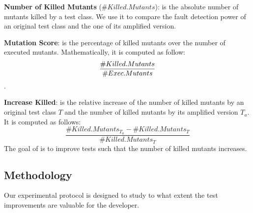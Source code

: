 \textbf{Number of Killed Mutants} ($\#Killed.Mutants$): is the absolute number of mutants killed by a test class. We use it to compare the fault detection power of an original test class and the one of its amplified version.

\textbf{Mutation Score}: is the percentage of killed mutants over the number of executed mutants. Mathematically, it is computed as follow:
$$\frac{\#Killed.Mutants}{\#Exec.Mutants} \time 100$$.

\textbf{Increase Killed}: is the relative increase of the number of killed mutants by an original test class $T$ and the number of killed mutants by its amplified version $T_a$.  It is computed as follows:
$$\frac{\#Killed.Mutants_{T_a} - \#Killed.Mutants_T}{\#Killed.Mutants_T}$$
The goal of \dspot is to improve tests such that the number of killed mutants  increases.

\subsection{Methodology}
\label{sec:methodo}

Our experimental protocol is designed to 
study to what extent the test improvements
are valuable for the developer.

